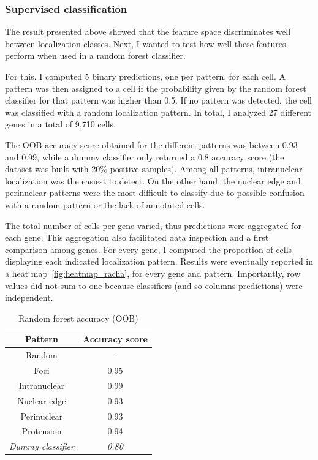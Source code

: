 \subsubsection{Supervised classification}

The result presented above showed that the feature space discriminates well between localization classes.
Next, I wanted to test how well these features perform when used in a random forest classifier.

For this, I computed 5 binary predictions, one per pattern, for each cell.
A pattern was then assigned to a cell if the probability given by the random forest classifier for that pattern was higher than 0.5.
If no pattern was detected, the cell was classified with a random localization pattern.
In total, I analyzed 27 different genes in a total of 9,710 cells.

The \ac{OOB} accuracy score obtained for the different patterns was between 0.93 and 0.99, while a dummy classifier only returned a 0.8 accuracy score (the dataset was built with 20\% positive samples).
Among all patterns, intranuclear localization was the easiest to detect.
On the other hand, the nuclear edge and perinuclear patterns were the most difficult to classify due to possible confusion with a random pattern or the lack of annotated cells.

The total number of cells per gene varied, thus predictions were aggregated for each gene.
This aggregation also facilitated data inspection and a first comparison among genes.
For every gene, I computed the proportion of cells displaying each indicated localization pattern.
Results were eventually reported in a heat map~\ref{fig:heatmap_racha}, for every gene and pattern.
Importantly, row values did not sum to one because classifiers (and so columns predictions) were independent.

\begin{table}
	\centering
	\begin{tabular}{| c | c |}
		\hline
		Pattern & Accuracy score\\
		\hline
		Random & -\\
		Foci & 0.95\\
		Intranuclear & 0.99\\
		Nuclear edge & 0.93\\
		Perinuclear & 0.93\\
		Protrusion & 0.94\\
		\hline
		\textit{Dummy classifier} & \textit{0.80}\\
		\hline
	\end{tabular}
	\caption[Random forest accuracy]{Random forest accuracy (OOB)}
	\label{table:accuracy_oob}
\end{table}

